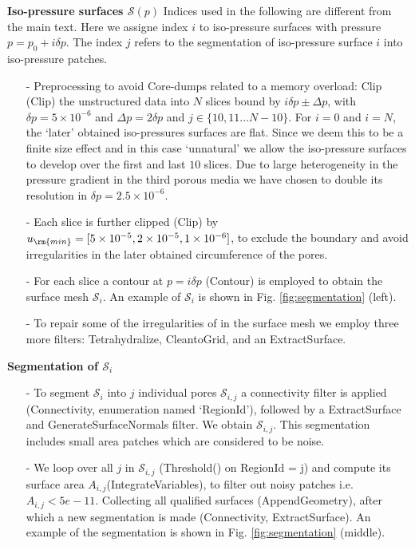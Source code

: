 \documentclass[draft,jgrga]{agutexSI2019}
\begin{document}
\begin{article}
\noindent\textbf{Iso-pressure surfaces $\mathcal{S}(p)$}
Indices used in the following are different from the main text. Here we assigne index $i$ to iso-pressure surfaces with pressure $p= p_0+ i\delta p$. The index $j$ refers to the segmentation of iso-pressure surface $i$ into iso-pressure patches. 
\begin{itemize}
	\item[-]Preprocessing to avoid Core-dumps related to a memory overload: Clip (Clip) the unstructured data into $N$ slices bound by $i\delta p\pm\Delta p$, with $\delta p = 5\times 10^{-6}$ and $\Delta p = 2\delta p$ and $j\in \{10,11\ldots N-10\}$. For $i=0$ and $i=N$, the `later' obtained iso-pressures surfaces are flat. Since we deem this to be a finite size effect and in this case `unnatural' we allow the iso-pressure surfaces to develop over the first and last $10$ slices. Due to large heterogeneity in the pressure gradient in the third porous media we have chosen to double its resolution in $\delta p = 2.5\times 10^{-6}$.
	\item[-]Each slice is further clipped (Clip) by $u_{\rm{min}} = [5\times 10^{-5},2\times 10^{-5},1\times 10^{-6}]$, to exclude the boundary and avoid irregularities in the later obtained circumference of the pores. 
	\item[-]For each slice a contour at $p =i\delta p$ (Contour) is employed to obtain the surface mesh $\mathcal{S}_i$. An example of $\mathcal{S}_i$ is shown in Fig. \ref{fig:segmentation} (left).
	\item[-]To repair some of the irregularities of in the surface mesh we employ three more filters: Tetrahydralize, CleantoGrid, and an ExtractSurface.
\end{itemize}
\noindent\textbf{Segmentation of $\mathcal{S}_i$}
\begin{itemize} 
	\item[-]To segment $\mathcal{S}_i$ into $j$ individual pores $\mathcal{S}_{i,j}$ a connectivity filter is applied (Connectivity, enumeration named `RegionId'), followed by a ExtractSurface and GenerateSurfaceNormals filter. We obtain $\mathcal{S}_{i,j}$. This segmentation includes small area patches which are considered to be noise. 
	\item[-]We loop over all $j$ in $\mathcal{S}_{i,j}$ (Threshold() on RegionId = j) and compute its surface area $A_{i,j}$(IntegrateVariables), to filter out noisy patches i.e. $A_{i,j}<5e-11$. Collecting all qualified surfaces (AppendGeometry), after which a new segmentation is made (Connectivity, ExtractSurface). An example of the segmentation is shown in Fig. \ref{fig:segmentation} (middle).

\end{itemize}
\end{article}
\end{document}
